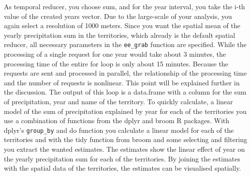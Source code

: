 As temporal reducer, you choose sum, and for the year interval, you take the i-th value of the created years vector. Due to the large-scale of your analysis, you again select a resolution of 1000 meters. Since you want the spatial mean of the yearly precipitation sum in the territories, which already is the default spatial reducer, all necessary parameters in the \texttt{ee\_grab} function are specified. While the processing of a single request for one year would take about 3 minutes, the processing time of the entire for loop is only about 15 minutes. Because the requests are sent and processed in parallel, the relationship of the processing time and the number of requests is nonlinear. This point will be explained further in the discussion. The output of this loop is a data.frame with a column for the sum of precipitation, year and name of the territory.  To quickly calculate, a linear model of the sum of precipitation explained by year for each of the territories you use a combination of functions from the dplyr and broom R packages. With dplyr's \texttt{group\_by} and do function you calculate a linear model for each of the territories and with the tidy function from broom and some selecting and filtering you extract the wanted estimates. The estimates show the linear effect of year on the yearly precipitation sum for each of the territories. 
By joining the estimates with the spatial data of the territories, the estimates can be visualised spatially. 

